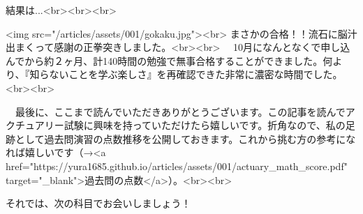 結果は...<br><br><br>

<img src="/articles/assets/001/gokaku.jpg"><br>
まさかの合格！！流石に脳汁出まくって感謝の正拳突きしました。<br><br>
　10月になんとなくで申し込んでから約２ヶ月、計140時間の勉強で無事合格することができました。何より、『知らないことを学ぶ楽しさ』を再確認できた非常に濃密な時間でした。<br><br>



　最後に、ここまで読んでいただきありがとうございます。この記事を読んでアクチュアリー試験に興味を持っていただけたら嬉しいです。折角なので、私の足跡として過去問演習の点数推移を公開しておきます。これから挑む方の参考になれば嬉しいです（→<a href="https://yura1685.github.io/articles/assets/001/actuary_math_score.pdf" target="_blank">過去問の点数</a>）。<br><br>

それでは、次の科目でお会いしましょう！
